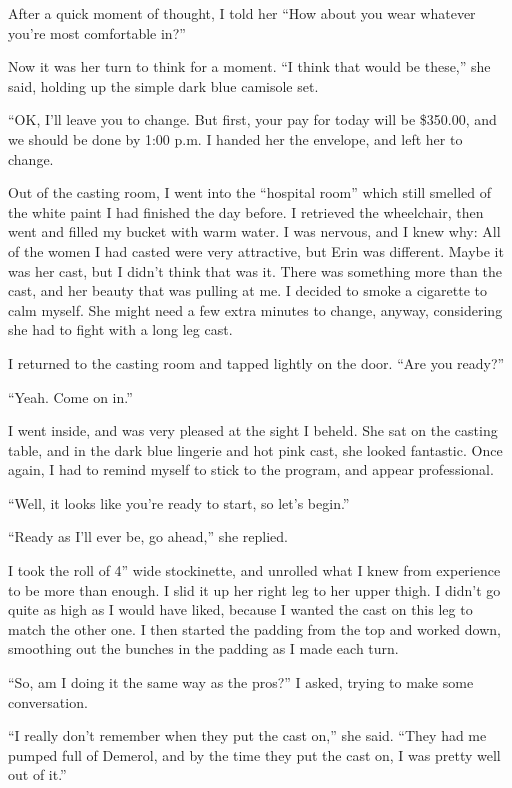 After a quick moment of thought, I told her ``How about you wear whatever you're most
comfortable in?''

Now it was her turn to think for a moment. ``I think that would be these,'' she said,
holding up the simple dark blue camisole set.

``OK, I'll leave you to change. But first, your pay for today will be \$350.00, and we
should be done by 1:00 p.m. I handed her the envelope, and left her to change.

Out of the casting room, I went into the ``hospital room'' which still smelled of the white
paint I had finished the day before. I retrieved the wheelchair, then went and filled my bucket
with warm water. I was nervous, and I knew why: All of the women I had casted were very
attractive, but Erin was different. Maybe it was her cast, but I didn't think that was it. There
was something more than the cast, and her beauty that was pulling at me. I decided to smoke a
cigarette to calm myself. She might need a few extra minutes to change, anyway, considering she
had to fight with a long leg cast.

I returned to the casting room and tapped lightly on the door. ``Are you ready?''

``Yeah. Come on in.''

I went inside, and was very pleased at the sight I beheld. She sat on the casting table, and
in the dark blue lingerie and hot pink cast, she looked fantastic. Once again, I had to remind
myself to stick to the program, and appear professional.

``Well, it looks like you're ready to start, so let's begin.''

``Ready as I'll ever be, go ahead,'' she replied.

I took the roll of 4'' wide stockinette, and unrolled what I knew from experience to be more
than enough. I slid it up her right leg to her upper thigh. I didn't go quite as high as I would
have liked, because I wanted the cast on this leg to match the other one. I then started the
padding from the top and worked down, smoothing out the bunches in the padding as I made each
turn.

``So, am I doing it the same way as the pros?'' I asked, trying to make some conversation.

``I really don't remember when they put the cast on,'' she said. ``They had me pumped full
of Demerol, and by the time they put the cast on, I was pretty well out of it.''

